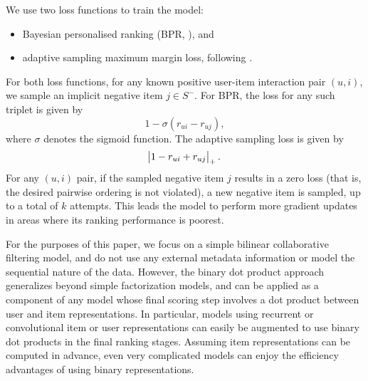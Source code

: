 \documentclass[sigchi]{acmart}
\newcommand\symUserInteractionSet{S}
\begin{document}
We use two loss functions to train the model:
\begin{itemize}
\item Bayesian personalised ranking (BPR, \citet{rendle2009bpr}), and
\item adaptive sampling maximum margin loss, following \citet{weston2011wsabie}.
\end{itemize}
For both loss functions, for any known positive user-item interaction pair $(u, i)$, we sample an implicit negative item $j \in \symUserInteractionSet^-$. For BPR, the loss for any such triplet is given by
\begin{equation}
1 - \sigma\left(r_{ui} - r_{uj}\right),
\end{equation}
where $\sigma$ denotes the sigmoid function.
The adaptive sampling loss is given by
\begin{equation}
\abs{1 - r_{ui} + r_{uj}}_{+}.
\end{equation}
For any $(u, i)$ pair, if the sampled negative item $j$ results in a zero loss (that is, the desired pairwise ordering is not violated), a new negative item is sampled, up to a total of $k$ attempts. This leads the model to perform more gradient updates in areas where its ranking performance is poorest.

For the purposes of this paper, we focus on a simple bilinear collaborative filtering model, and do not use any external metadata information or model the sequential nature of the data. However, the binary dot product approach generalizes beyond simple factorization models, and can be applied as a component of any model whose final scoring step involves a dot product between user and item representations. In particular, models using recurrent \citep{hidasi2015session} or convolutional \citep{lynch2015images} item or user representations can easily be augmented to use binary dot products in the final ranking stages. Assuming item representations can be computed in advance, even very complicated models can enjoy the efficiency advantages of using binary representations.
\end{document}
